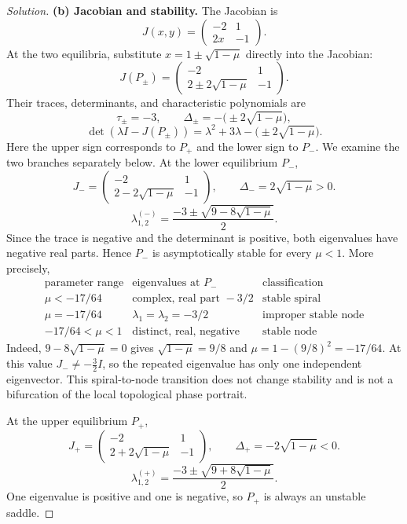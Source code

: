 \documentclass[10pt]{amsart}
\newenvironment{solution}
{\begin{proof}[Solution]}
{\end{proof}}
\begin{document}
\begin{onehalfspace}
\begin{solution}
\medskip
\textbf{(b) Jacobian and stability.} The Jacobian is
\[
    J(x,y)=
    \begin{pmatrix}-2&1\\2x&-1\end{pmatrix}.
\]
At the two equilibria, substitute $x=1\pm\sqrt{1-\mu}$ directly into the Jacobian:
\[
    J(P_\pm)=\begin{pmatrix}
        -2&1\\2\pm2\sqrt{1-\mu}&-1
    \end{pmatrix}.
\]
Their traces, determinants, and characteristic polynomials are
\[
    \tau_\pm=-3,\qquad \Delta_\pm=-\bigl(\pm2\sqrt{1-\mu}\bigr),
\]
\[
    \det(\lambda I-J(P_\pm))
       =\lambda^2+3\lambda-\bigl(\pm2\sqrt{1-\mu}\bigr).
\]
Here the upper sign corresponds to $P_+$ and the lower sign to $P_-$. We examine the two branches separately below.
At the lower equilibrium $P_-$,
\[
    J_- =\begin{pmatrix}-2&1\\2-2\sqrt{1-\mu}&-1\end{pmatrix},
    \qquad \Delta_-=2\sqrt{1-\mu}>0.
\]
\[
    \lambda_{1,2}^{(-)}=\frac{-3\pm\sqrt{9-8\sqrt{1-\mu}}}2.
\]
Since the trace is negative and the determinant is positive, both eigenvalues have negative real parts. Hence $P_-$ is asymptotically stable for every $\mu<1$. More precisely,
\[
\begin{array}{c|c|c}
\text{parameter range}&\text{eigenvalues at }P_-&\text{classification}\\ \hline
\mu<-17/64 & \text{complex, real part }-3/2 & \text{stable spiral}\\
\mu=-17/64 & \lambda_1=\lambda_2=-3/2 & \text{improper stable node}\\
-17/64<\mu<1 & \text{distinct, real, negative} & \text{stable node}
\end{array}
\]
Indeed, $9-8\sqrt{1-\mu}=0$ gives $\sqrt{1-\mu}=9/8$ and $\mu=1-(9/8)^2=-17/64$. At this value $J_-\ne-\tfrac32 I$, so the repeated eigenvalue has only one independent eigenvector. This spiral-to-node transition does not change stability and is not a bifurcation of the local topological phase portrait.

At the upper equilibrium $P_+$,
\[
    J_+=\begin{pmatrix}-2&1\\2+2\sqrt{1-\mu}&-1\end{pmatrix},
    \qquad \Delta_+=-2\sqrt{1-\mu}<0.
\]
\[
    \lambda_{1,2}^{(+)}=\frac{-3\pm\sqrt{9+8\sqrt{1-\mu}}}2.
\]
One eigenvalue is positive and one is negative, so $P_+$ is always an unstable saddle.


\end{solution}
\end{onehalfspace}
\end{document}
